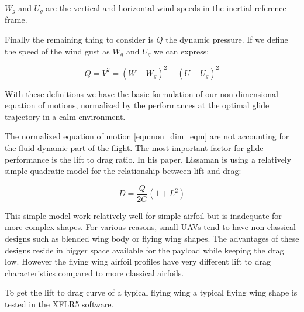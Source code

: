 $W_g$ and $U_g$ are the vertical and horizontal wind speeds in the inertial reference frame.

\par Finally the remaining thing to consider is $Q$ the dynamic pressure. If we define the speed of the wind gust as $W_g$ and $U_g$ we can express:

\begin{equation}
  Q = V^2 = (W-W_g)^2 + (U-U_g)^2
  \label{eqn:q_def}
\end{equation}

\par With these definitions we have the basic formulation of our non-dimensional equation of motions, normalized by the performances at the optimal glide trajectory in a calm environment.

The normalized equation of motion \ref{eqn:non_dim_eqm} are not accounting for the fluid dynamic part of the flight.
The most important factor for glide performance is the lift to drag ratio. 
In his paper, Lissaman \cite{Lissaman2007neutral} is using a relatively simple quadratic model for the relationship between lift and drag:

\begin{equation}
  D=\frac{Q}{2G}(1+L^2)
  \label{eqn:Lissaman_G}
\end{equation}


\par This simple model work relatively well for simple airfoil but is inadequate for more complex shapes.
For various reasons, small UAVs tend to have non classical designs such as blended wing body or flying wing shapes.
The advantages of these designs reside in bigger space available for the payload while keeping the drag low.
However the flying wing airfoil profiles have very different lift to drag characteristics compared to more classical airfoils.

\par To get the lift to drag curve of a typical flying wing a typical flying wing shape is tested in the XFLR5 software.

